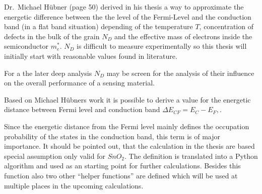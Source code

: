 \documentclass[11pt]{article}
\begin{document}
Dr.~Michael Hübner (page 50) derived in his thesis a way to approximate
the energetic difference between the the level of the Fermi-Level and
the conduction band (in a flat band situation) depending of the
temperature \(T\), concentration of defects in the bulk of the grain
\(N_D\) and the effective mass of electrons inside the semiconductor
\(m_e^*\). \(N_D\) is difficult to measure experimentally so this thesis
will initially start with reasonable values found in literature.

For a the later deep analysis \(N_D\) may be screen for the analysis of
their influence on the overall performance of a sensing material.

Based on Michael Hübners work it is possible to derive a value for the
energetic distance between Fermi level and conduction band
\(\Delta E_{CF} = E_C-E_F,\).

Since the energetic distance from the Fermi level mainly defines the
occupation probability of the states in the conduction band, this term
is of major importance. It should be pointed out, that the calculation
in the thesis are based special assumption only valid for \(SnO_2\). The
definition is translated into a Python algorithm and used as an starting
point for further calculations. Besides this function also two other
``helper functions'' are defined which will be used at multiple places
in the upcoming calculations.
\end{document}
